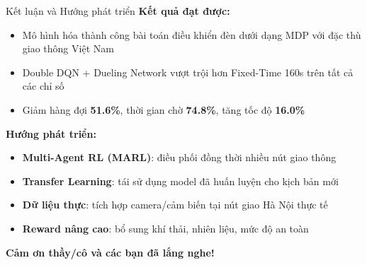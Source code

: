 \begin{frame}{Kết luận và Hướng phát triển}
\textbf{Kết quả đạt được:}
\begin{itemize}
    \item Mô hình hóa thành công bài toán điều khiển đèn dưới dạng MDP với đặc thù giao thông Việt Nam
    \item Double DQN + Dueling Network vượt trội hơn Fixed-Time 160s trên tất cả các chỉ số
    \item Giảm hàng đợi \textbf{51.6\%}, thời gian chờ \textbf{74.8\%}, tăng tốc độ \textbf{16.0\%}
\end{itemize}

\vspace{6pt}
\textbf{Hướng phát triển:}
\begin{itemize}
    \item \textbf{Multi-Agent RL (MARL)}: điều phối đồng thời nhiều nút giao thông
    \item \textbf{Transfer Learning}: tái sử dụng model đã huấn luyện cho kịch bản mới
    \item \textbf{Dữ liệu thực}: tích hợp camera/cảm biến tại nút giao Hà Nội thực tế
    \item \textbf{Reward nâng cao}: bổ sung khí thải, nhiên liệu, mức độ an toàn
\end{itemize}
\end{frame}

\begin{frame}{}
\centering
\vspace{2cm}
{\LARGE \textbf{Cảm ơn thầy/cô và các bạn đã lắng nghe!}}\\[1cm]
\end{frame}
